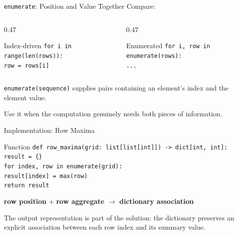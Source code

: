 \documentclass[aspectratio=169,10pt]{beamer}
\begin{document}
\begin{frame}{\texttt{enumerate}: Position and Value Together}
  Compare:

  \begin{columns}[T,onlytextwidth]
    \begin{column}{0.47\textwidth}
      \begin{block}{Index-driven}
        \texttt{for i in range(len(rows)):}\\
        \hspace*{0.20in}\texttt{row = rows[i]}
      \end{block}
    \end{column}
    \begin{column}{0.47\textwidth}
      \begin{block}{Enumerated}
        \texttt{for i, row in enumerate(rows):}\\
        \hspace*{0.20in}\texttt{...}
      \end{block}
    \end{column}
  \end{columns}

  \begin{cpdefinition}
    \texttt{enumerate(sequence)} supplies pairs containing an element's index and the element value.
  \end{cpdefinition}

  Use it when the computation genuinely needs both pieces of information.
\end{frame}

\begin{frame}{Implementation: Row Maxima}
  \begin{block}{Function}
    \texttt{def row\_maxima(grid: list[list[int]]) -> dict[int, int]:}\\
    \hspace*{0.20in}\texttt{result = \{\}}\\
    \hspace*{0.20in}\texttt{for index, row in enumerate(grid):}\\
    \hspace*{0.40in}\texttt{result[index] = max(row)}\\
    \hspace*{0.20in}\texttt{return result}
  \end{block}

  \begin{center}
    \textbf{row position} $+$ \textbf{row aggregate} $\longrightarrow$ \textbf{dictionary association}
  \end{center}

  \begin{keyidea}
    The output representation is part of the solution: the dictionary preserves an explicit association between each row index and its summary value.
  \end{keyidea}
\end{frame}
\end{document}
